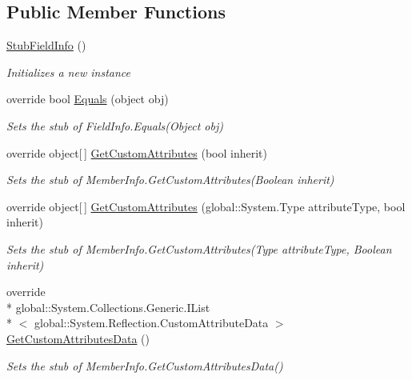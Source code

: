 \subsection*{Public Member Functions}
\begin{DoxyCompactItemize}
\item 
\hyperlink{class_system_1_1_reflection_1_1_fakes_1_1_stub_field_info_a0899a4173d32d9268e4beaf14b7b55a6}{Stub\-Field\-Info} ()
\begin{DoxyCompactList}\small\item\em Initializes a new instance\end{DoxyCompactList}\item 
override bool \hyperlink{class_system_1_1_reflection_1_1_fakes_1_1_stub_field_info_abcc863d14dc4967fa860e16fa40ee8da}{Equals} (object obj)
\begin{DoxyCompactList}\small\item\em Sets the stub of Field\-Info.\-Equals(\-Object obj)\end{DoxyCompactList}\item 
override object\mbox{[}$\,$\mbox{]} \hyperlink{class_system_1_1_reflection_1_1_fakes_1_1_stub_field_info_aa074dc657ca4f7d3ff693a8d3b585d64}{Get\-Custom\-Attributes} (bool inherit)
\begin{DoxyCompactList}\small\item\em Sets the stub of Member\-Info.\-Get\-Custom\-Attributes(\-Boolean inherit)\end{DoxyCompactList}\item 
override object\mbox{[}$\,$\mbox{]} \hyperlink{class_system_1_1_reflection_1_1_fakes_1_1_stub_field_info_a75ed9b16d090087620018eaaa9b1f376}{Get\-Custom\-Attributes} (global\-::\-System.\-Type attribute\-Type, bool inherit)
\begin{DoxyCompactList}\small\item\em Sets the stub of Member\-Info.\-Get\-Custom\-Attributes(\-Type attribute\-Type, Boolean inherit)\end{DoxyCompactList}\item 
override \\*
global\-::\-System.\-Collections.\-Generic.\-I\-List\\*
$<$ global\-::\-System.\-Reflection.\-Custom\-Attribute\-Data $>$ \hyperlink{class_system_1_1_reflection_1_1_fakes_1_1_stub_field_info_a0779247d013abac0934193734bbd9a42}{Get\-Custom\-Attributes\-Data} ()
\begin{DoxyCompactList}\small\item\em Sets the stub of Member\-Info.\-Get\-Custom\-Attributes\-Data()\end{DoxyCompactList}\item 

\end{DoxyCompactItemize}
